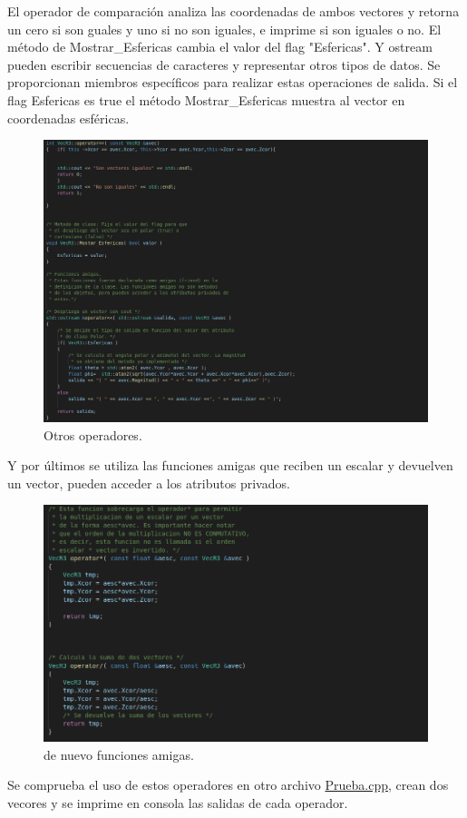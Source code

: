 \documentclass[11pt]{article}
\begin{document}
	El operador de comparación analiza las coordenadas de ambos vectores y retorna un cero si son guales y uno si no son iguales, e imprime si son iguales o no.  El método de Mostrar\_Esfericas cambia el valor del flag "Esfericas". Y ostream pueden escribir secuencias de caracteres y representar otros tipos de datos. Se proporcionan miembros específicos para realizar estas operaciones de salida. Si el flag Esfericas es true el método Mostrar\_Esfericas muestra al vector en coordenadas esféricas.
	
	
	
	\begin{figure}[H]
		\centering
		\includegraphics[width=0.7\linewidth]{img7}
		\caption{Otros operadores. }
	\end{figure}

Y por últimos se utiliza las funciones amigas que reciben un escalar y devuelven un vector, pueden acceder a los atributos privados.

	\begin{figure}[H]
	\centering
	\includegraphics[width=0.7\linewidth]{img8}
	\caption{de nuevo funciones amigas. }
\end{figure}

Se comprueba el uso de estos operadores en otro archivo \href{https://github.com/Mohs9/Lab-Avanzado/blob/eee254f75da3f1da0648a65ce5d045611bca5708/Tareas/T1_II_3/prueba.cpp}{Prueba.cpp}, crean dos vecores y se imprime en consola las salidas de cada operador.
\end{document}
